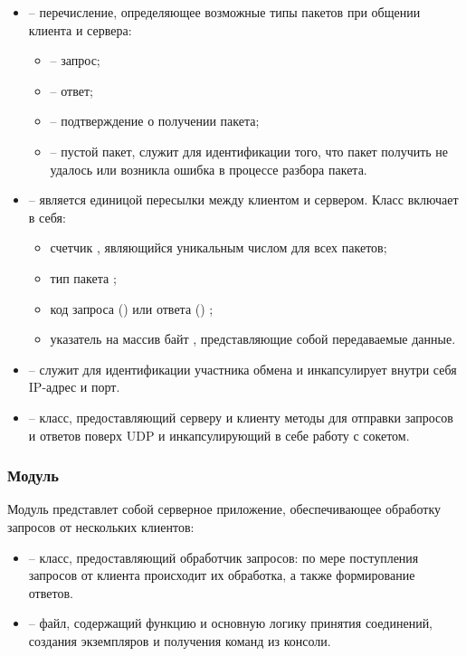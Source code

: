 \begin{itemize}
	\item {} -- перечисление, определяющее возможные типы пакетов при общении клиента и сервера:
	\begin{itemize}
		\item {} -- запрос;
		\item {} -- ответ;
		\item {} -- подтверждение о получении пакета;
		\item {} -- пустой пакет, служит для идентификации того, что пакет получить не удалось или возникла ошибка в процессе разбора пакета.
	\end{itemize}
	\item {} -- является единицой пересылки между клиентом и сервером. Класс включает в себя:
	\begin{itemize}
		\item счетчик , являющийся уникальным числом для всех пакетов;
		\item тип пакета ;
		\item код запроса () или ответа () ;
		\item указатель на массив байт , представляющие собой передаваемые данные.
	\end{itemize}
	\item {} -- служит для идентификации участника обмена и инкапсулирует внутри себя IP-адрес и порт.
	\item {} -- класс, предоставляющий серверу и клиенту методы для отправки запросов и ответов поверх UDP и инкапсулирующий в себе работу с сокетом.
\end{itemize}

\subsubsection{Модуль }

Модуль  представлет собой серверное приложение, обеспечивающее обработку запросов от нескольких клиентов:
\begin{itemize}
	\item {} -- класс, предоставляющий обработчик запросов: по мере поступления запросов от клиента происходит их обработка, а также формирование ответов.
	\item {} -- файл, содержащий функцию  и основную логику принятия соединений, создания экземпляров  и получения команд из консоли.
\end{itemize}

